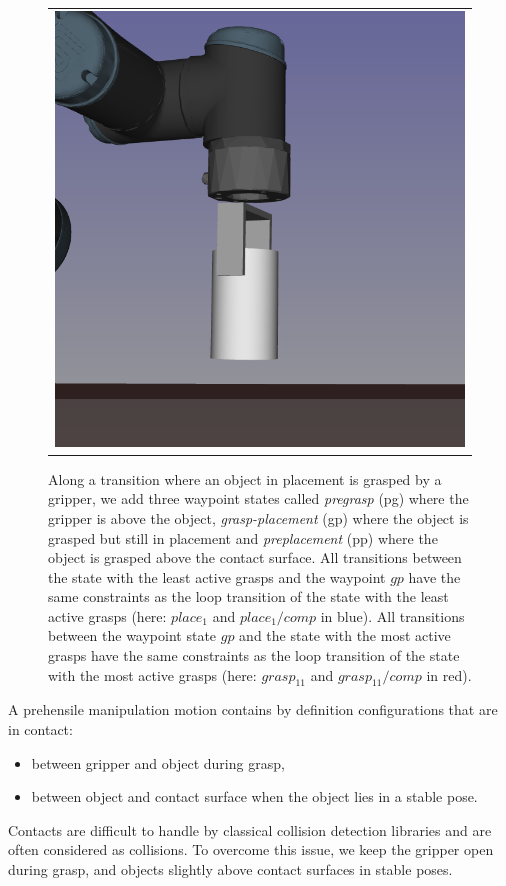 \begin{figure}
{{\begin {tabular}{c}
      \includegraphics [width=.9\linewidth] {figures/placement-preplace-ur3.png}\\
      \end{tabular}
    }
  }
  \caption{Along a transition where an object in placement is grasped
    by a gripper, we add three waypoint states called
    \textit{pregrasp} (pg) where the gripper is above the object,
    \textit{grasp-placement} (gp) where the object is grasped but
    still in placement and \textit{preplacement} (pp) where the object
    is grasped above the contact surface. All transitions between the
    state with the least active grasps and the waypoint $gp$ have the
    same constraints as the loop transition of the state with the
    least active grasps (here: $place_1$ and $place_1/comp$ in
    blue). All transitions between the waypoint state $gp$ and the
    state with the most active grasps have the same constraints as the
    loop transition of the state with the most active grasps (here: $grasp_{11}$
    and $grasp_{11}/comp$ in red).}
  \label{fig:pregrasp-placement}
\end{figure}

A prehensile manipulation motion contains by definition configurations that are in contact:
\begin{itemize}
\item between gripper and object during grasp,
\item between object and contact surface when the object lies in a stable pose.
\end{itemize}
Contacts are difficult to handle by classical collision detection libraries and are often considered as collisions. To overcome this issue, we keep the gripper open during grasp, and objects slightly above contact surfaces in stable poses.

